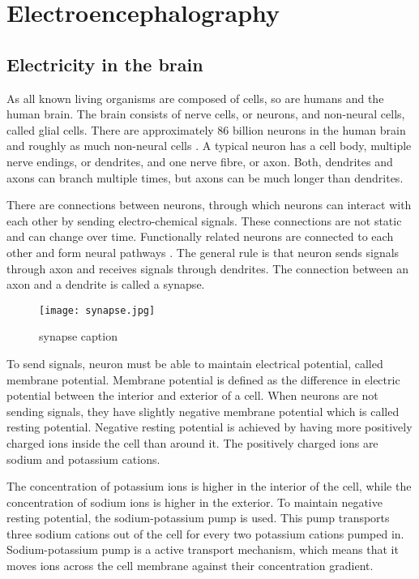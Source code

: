 
\chapter{Electroencephalography}
\section{Electricity in the brain}
As all known living organisms are composed of cells, so are humans and the human brain. The brain consists of nerve cells, or neurons, and non-neural cells, called glial cells. There are approximately 86 billion neurons in the human brain and roughly as much non-neural cells \cite{neuroncount}. A typical neuron has a cell body, multiple nerve endings, or dendrites, and one nerve fibre, or axon. Both, dendrites and axons can branch multiple times, but axons can be much longer than dendrites. 

There are connections between neurons, through which neurons can interact with each other by sending electro-chemical signals. These connections are not static and can change over time. Functionally related neurons are connected to each other and form neural pathways \cite{neuralpathway}. The general rule is that neuron sends signals through axon and receives signals through dendrites. The connection between an axon and a dendrite is called a synapse. 

\begin{figure}[h]
\centering
\texttt{[image: synapse.jpg]}
\caption{synapse caption\cite[p.~17]{neuronpic}}
\label{synapse}
\end{figure}

To send signals, neuron must be able to maintain electrical potential, called membrane potential. Membrane potential is defined as the difference in electric potential between the interior and exterior of a cell. When neurons are not sending signals, they have slightly negative membrane potential which is called resting potential. Negative resting potential is achieved by having more positively charged ions inside the cell than around it. The positively charged ions are sodium and potassium cations.

The concentration of potassium ions is higher in the interior of the cell, while the concentration of sodium ions is higher in the exterior. To maintain negative resting potential, the sodium-potassium pump is used. This pump transports three sodium cations out of the cell for every two potassium cations pumped in. Sodium-potassium pump is a active transport mechanism, which means that it moves ions across the cell membrane against their concentration gradient.

